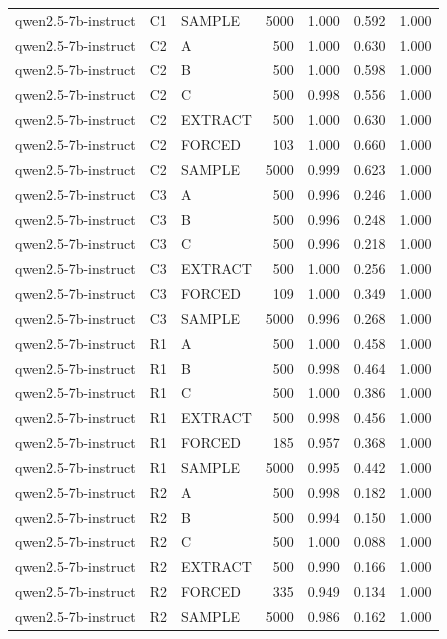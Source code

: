 \begin{table}
\begin{tabular}{lllrrrr}
qwen2.5-7b-instruct & C1 & SAMPLE & 5000 & 1.000 & 0.592 & 1.000 \\
qwen2.5-7b-instruct & C2 & A & 500 & 1.000 & 0.630 & 1.000 \\
qwen2.5-7b-instruct & C2 & B & 500 & 1.000 & 0.598 & 1.000 \\
qwen2.5-7b-instruct & C2 & C & 500 & 0.998 & 0.556 & 1.000 \\
qwen2.5-7b-instruct & C2 & EXTRACT & 500 & 1.000 & 0.630 & 1.000 \\
qwen2.5-7b-instruct & C2 & FORCED & 103 & 1.000 & 0.660 & 1.000 \\
qwen2.5-7b-instruct & C2 & SAMPLE & 5000 & 0.999 & 0.623 & 1.000 \\
qwen2.5-7b-instruct & C3 & A & 500 & 0.996 & 0.246 & 1.000 \\
qwen2.5-7b-instruct & C3 & B & 500 & 0.996 & 0.248 & 1.000 \\
qwen2.5-7b-instruct & C3 & C & 500 & 0.996 & 0.218 & 1.000 \\
qwen2.5-7b-instruct & C3 & EXTRACT & 500 & 1.000 & 0.256 & 1.000 \\
qwen2.5-7b-instruct & C3 & FORCED & 109 & 1.000 & 0.349 & 1.000 \\
qwen2.5-7b-instruct & C3 & SAMPLE & 5000 & 0.996 & 0.268 & 1.000 \\
qwen2.5-7b-instruct & R1 & A & 500 & 1.000 & 0.458 & 1.000 \\
qwen2.5-7b-instruct & R1 & B & 500 & 0.998 & 0.464 & 1.000 \\
qwen2.5-7b-instruct & R1 & C & 500 & 1.000 & 0.386 & 1.000 \\
qwen2.5-7b-instruct & R1 & EXTRACT & 500 & 0.998 & 0.456 & 1.000 \\
qwen2.5-7b-instruct & R1 & FORCED & 185 & 0.957 & 0.368 & 1.000 \\
qwen2.5-7b-instruct & R1 & SAMPLE & 5000 & 0.995 & 0.442 & 1.000 \\
qwen2.5-7b-instruct & R2 & A & 500 & 0.998 & 0.182 & 1.000 \\
qwen2.5-7b-instruct & R2 & B & 500 & 0.994 & 0.150 & 1.000 \\
qwen2.5-7b-instruct & R2 & C & 500 & 1.000 & 0.088 & 1.000 \\
qwen2.5-7b-instruct & R2 & EXTRACT & 500 & 0.990 & 0.166 & 1.000 \\
qwen2.5-7b-instruct & R2 & FORCED & 335 & 0.949 & 0.134 & 1.000 \\
qwen2.5-7b-instruct & R2 & SAMPLE & 5000 & 0.986 & 0.162 & 1.000 \\

\end{tabular}
\end{table}
